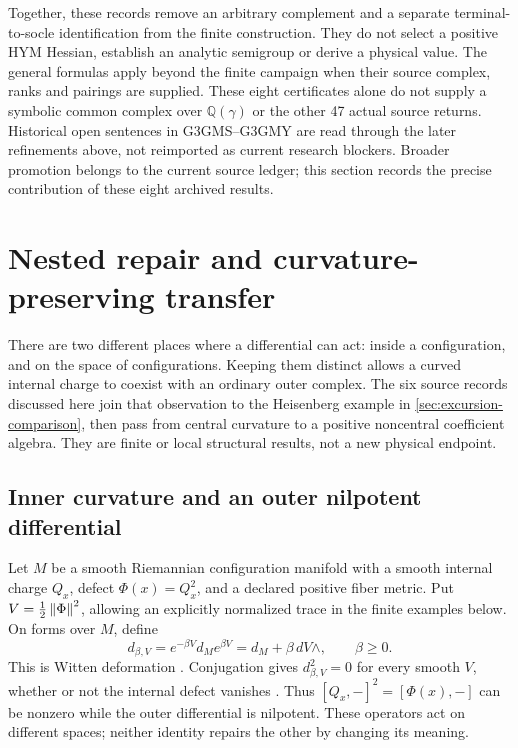 \documentclass[11pt,a4paper]{article}
\begin{document}
Together, these records remove an arbitrary complement and a separate
terminal-to-socle identification from the finite construction. They do
not select a positive HYM Hessian, establish an analytic semigroup or
derive a physical value. The general formulas apply beyond the finite
campaign when their source complex, ranks and pairings are supplied.
These eight certificates alone do not supply a symbolic common complex
over \(\mathbb Q(\gamma)\) or the other 47 actual source returns.
Historical open sentences in G3GMS--G3GMY are read through the later
refinements above, not reimported as current research blockers. Broader
promotion belongs to the current source ledger; this section records
the precise contribution of these eight archived results.

\section{Nested repair and curvature-preserving transfer}
\label{sec:nested-transfer}

There are two different places where a differential can act: inside a
configuration, and on the space of configurations. Keeping them distinct
allows a curved internal charge to coexist with an ordinary outer complex.
The six source records discussed here join that observation to the
Heisenberg example in \cref{sec:excursion-comparison}, then pass from
central curvature to a positive noncentral coefficient algebra. They are
finite or local structural results, not a new physical endpoint.

\subsection{Inner curvature and an outer nilpotent differential}
\label{sec:nested-witten}
Let \(M\) be a smooth Riemannian configuration manifold with a smooth
internal charge \(Q_x\), defect \(\Phi(x)=Q_x^2\), and a declared positive
fiber metric. Put \(V=\frac12\left\lVert \Phi \right\rVert^2\), allowing an explicitly
normalized trace in the finite examples below. On forms over \(M\), define
\[
 d_{\beta,V}=e^{-\beta V}d_M e^{\beta V}
             =d_M+\beta\,dV\wedge,\qquad \beta\geq0.
\]
This is Witten deformation \cite{WittenMorse1982}. Conjugation gives
\(d_{\beta,V}^2=0\) for every smooth \(V\), whether or not the internal
defect vanishes \cite{PreprojectionNestedWitten2026}. Thus
\([Q_x,-]^2=[\Phi(x),-]\) can be nonzero while the outer differential is
nilpotent. These operators act on different spaces; neither identity
repairs the other by changing its meaning.
\end{document}

